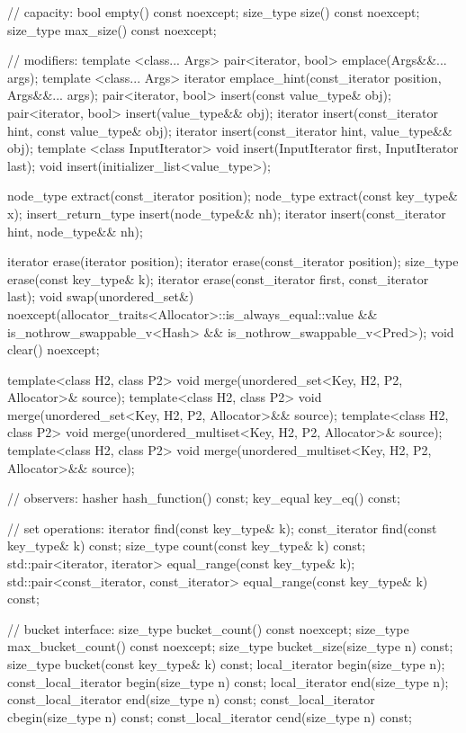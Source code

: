 \begin{codeblock}
{{    // capacity:
    bool      empty() const noexcept;
    size_type size() const noexcept;
    size_type max_size() const noexcept;

    // modifiers:
    template <class... Args> pair<iterator, bool> emplace(Args&&... args);
    template <class... Args> iterator emplace_hint(const_iterator position, Args&&... args);
    pair<iterator, bool> insert(const value_type& obj);
    pair<iterator, bool> insert(value_type&& obj);
    iterator insert(const_iterator hint, const value_type& obj);
    iterator insert(const_iterator hint, value_type&& obj);
    template <class InputIterator> void insert(InputIterator first, InputIterator last);
    void insert(initializer_list<value_type>);

    node_type extract(const_iterator position);
    node_type extract(const key_type& x);
    insert_return_type insert(node_type&& nh);
    iterator           insert(const_iterator hint, node_type&& nh);

    iterator  erase(iterator position);
    iterator  erase(const_iterator position);
    size_type erase(const key_type& k);
    iterator  erase(const_iterator first, const_iterator last);
    void      swap(unordered_set&)
      noexcept(allocator_traits<Allocator>::is_always_equal::value &&
               is_nothrow_swappable_v<Hash> &&
               is_nothrow_swappable_v<Pred>);
    void      clear() noexcept;

    template<class H2, class P2>
      void merge(unordered_set<Key, H2, P2, Allocator>& source);
    template<class H2, class P2>
      void merge(unordered_set<Key, H2, P2, Allocator>&& source);
    template<class H2, class P2>
      void merge(unordered_multiset<Key, H2, P2, Allocator>& source);
    template<class H2, class P2>
      void merge(unordered_multiset<Key, H2, P2, Allocator>&& source);

    // observers:
    hasher hash_function() const;
    key_equal key_eq() const;

    // set operations:
    iterator       find(const key_type& k);
    const_iterator find(const key_type& k) const;
    size_type      count(const key_type& k) const;
    std::pair<iterator, iterator>             equal_range(const key_type& k);
    std::pair<const_iterator, const_iterator> equal_range(const key_type& k) const;

    // bucket interface:
    size_type bucket_count() const noexcept;
    size_type max_bucket_count() const noexcept;
    size_type bucket_size(size_type n) const;
    size_type bucket(const key_type& k) const;
    local_iterator begin(size_type n);
    const_local_iterator begin(size_type n) const;
    local_iterator end(size_type n);
    const_local_iterator end(size_type n) const;
    const_local_iterator cbegin(size_type n) const;
    const_local_iterator cend(size_type n) const;

}}
\end{codeblock}
